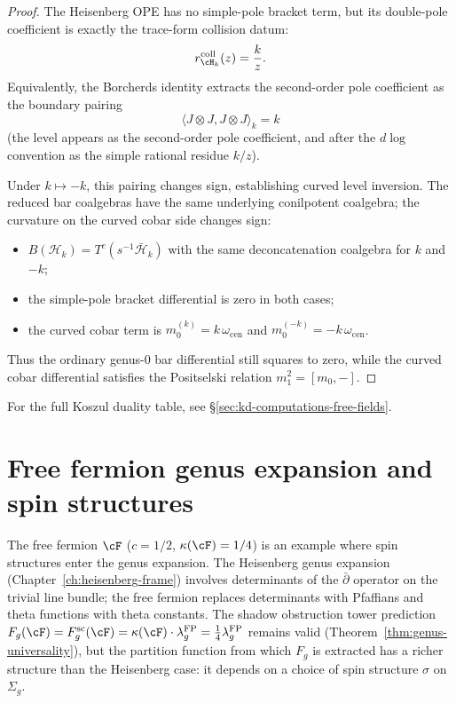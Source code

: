 \begin{proof}
The Heisenberg OPE has no simple-pole bracket term, but its
double-pole coefficient is exactly the trace-form collision datum:
\[
r_{\cH_k}^{\mathrm{coll}}(z)=\frac{k}{z}.
\]
Equivalently, the Borcherds identity extracts the second-order pole
coefficient as the boundary pairing
\[
\langle J \otimes J, J \otimes J \rangle_k = k
\]
(the level appears as the second-order pole coefficient, and after
the $d\log$ convention as the simple rational residue $k/z$).

Under $k \mapsto -k$, this pairing changes sign, establishing curved
level inversion. The reduced bar coalgebras have the same underlying
conilpotent coalgebra; the curvature on the curved cobar side changes
sign:
\begin{itemize}
\item $B(\mathcal{H}_k)=T^c(s^{-1}\bar{\mathcal{H}}_k)$ with
the same deconcatenation coalgebra for $k$ and $-k$;
\item the simple-pole bracket differential is zero in both cases;
\item the curved cobar term is
$m_0^{(k)}=k\,\omega_{\mathrm{cen}}$ and
$m_0^{(-k)}=-k\,\omega_{\mathrm{cen}}$.
\end{itemize}
Thus the ordinary genus-$0$ bar differential still squares to zero,
while the curved cobar differential satisfies the Positselski relation
$m_1^2=[m_0,-]$.
\end{proof}

For the full Koszul duality table, see \S\ref{sec:kd-computations-free-fields}.


\section{Free fermion genus expansion and spin structures}
\label{sec:free-fermion-genus-expansion}

The free fermion $\cF$ ($c = 1/2$, $\kappa(\cF)=1/4$) is
an example where spin structures enter the genus
expansion. The Heisenberg genus expansion
(Chapter~\ref{ch:heisenberg-frame}) involves determinants of
the $\bar\partial$ operator on the trivial line bundle; the free
fermion replaces determinants with Pfaffians and theta functions
with theta constants. The shadow obstruction tower prediction
$F_g(\cF)=F_g^{\mathrm{sc}}(\cF)
=\kappa(\cF) \cdot \lambda_g^{\mathrm{FP}}
= \frac{1}{4}\lambda_g^{\mathrm{FP}}$ remains valid
(Theorem~\ref{thm:genus-universality}), but the partition
function from which $F_g$ is extracted has a richer structure
than the Heisenberg case: it depends on a choice of spin
structure $\sigma$ on $\Sigma_g$.

